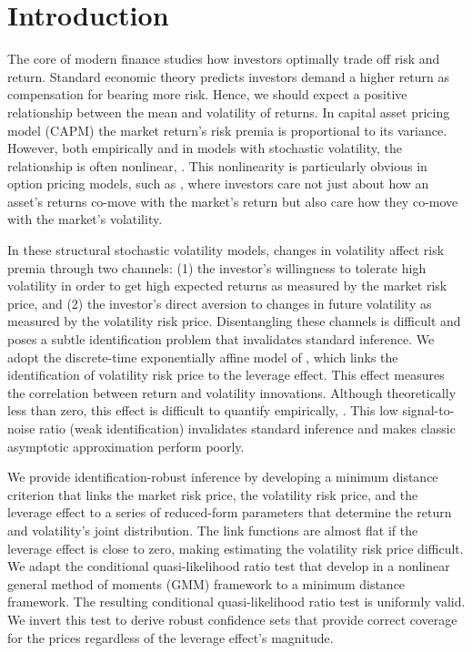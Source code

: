 \documentclass[11pt, letterpaper, twoside]{article}
\begin{document}
\clearpage

\section{Introduction}

The core of modern finance studies how investors optimally trade off risk and return. Standard economic theory predicts investors demand a higher return as compensation for bearing more risk. Hence, we should expect a positive relationship between the mean and volatility of returns. In  capital asset pricing model (CAPM) the market return's risk premia is proportional to its variance. However, both empirically and in models with stochastic volatility, the relationship is often nonlinear, \parencites{bansal2014volatility, dewbecker2017price}. This nonlinearity is particularly obvious in option pricing models, such as \textcites{bates2008market, christoffersen2013capturing}, where investors care not just about how an asset's returns co-move with the market's return but also care how they co-move with the market's volatility.

In these structural stochastic volatility models, changes in volatility affect risk premia through two channels: (1) the investor's willingness to tolerate high volatility in order to get high expected returns as measured by the market risk price, and (2) the investor’s direct aversion to changes in future volatility as measured by the volatility risk price. Disentangling these channels is difficult and poses a subtle identification problem that invalidates standard inference. We adopt the discrete-time exponentially affine model of \textcite{han2018leverage}, which links the identification of volatility risk price to the leverage effect. This effect measures the correlation between return and volatility innovations. Although theoretically less than zero, this effect is difficult to quantify empirically, \parencites{bandi2012timevarying, aitsahalia2013leverage}. This low signal-to-noise ratio (weak identification) invalidates standard inference and makes classic asymptotic approximation perform poorly.

We provide identification-robust inference by developing a minimum distance criterion that links the market risk price, the volatility risk price, and the leverage effect to a series of reduced-form parameters that determine the return and volatility's joint distribution. The link functions are almost flat if the leverage effect is close to zero, making estimating the volatility risk price difficult. We adapt the conditional quasi-likelihood ratio test that \textcite{andrews2016conditional} develop in a nonlinear general method of moments (GMM) framework to a minimum distance framework. The resulting conditional quasi-likelihood ratio test is uniformly valid. We invert this test to derive robust confidence sets that provide correct coverage for the prices regardless of the leverage effect's magnitude. 
\end{document}
